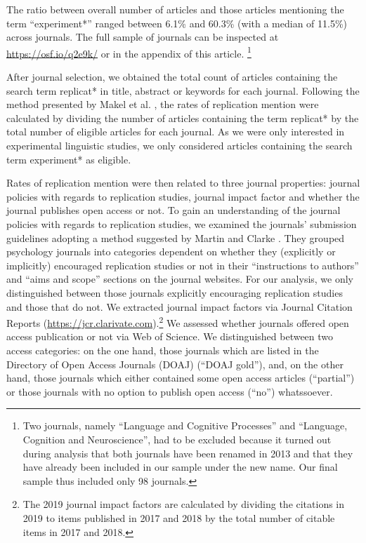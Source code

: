 \documentclass[cm,linguex]{glossa}
\begin{document}
The ratio between overall number of articles and those articles mentioning the term ``experiment*'' ranged between 6.1\% and 60.3\% (with a median of 11.5\%) across journals.
The full sample of journals can be inspected at \url{https://osf.io/q2e9k/} or in the appendix of this article. \footnote{Two journals, namely ``Language and Cognitive Processes'' and ``Language, Cognition and Neuroscience'', had to be excluded because it turned out during analysis that both journals have been renamed in 2013 and that they have already been included in our sample under the new name. Our final sample thus included only 98 journals.}

After journal selection, we obtained the total count of articles containing the search term replicat* in title, abstract or keywords for each journal.
Following the method presented by Makel et al. \citeyearpar{makel_replications_2012}, the rates of replication mention were calculated by dividing the number of articles containing the term replicat* by the total number of eligible articles for each journal. As we were only interested in experimental linguistic studies, we only considered articles containing the search term experiment* as eligible.

Rates of replication mention were then related to three journal properties: journal policies with regards to replication studies, journal impact factor and whether the journal publishes open access or not.
To gain an understanding of the journal policies with regards to replication studies, we examined the journals' submission guidelines adopting a method suggested by Martin and Clarke \citeyearpar{martin_are_2017}.
They grouped psychology journals into categories dependent on whether they (explicitly or implicitly) encouraged replication studies or not in their ``instructions to authors'' and ``aims and scope'' sections on the journal websites. For our analysis, we only distinguished between those journals explicitly encouraging replication studies and those that do not.
We extracted journal impact factors via Journal Citation Reports (\url{https://jcr.clarivate.com}).\footnote{The 2019 journal impact factors are calculated by dividing the citations in 2019 to items published in 2017 and 2018 by the total number of citable items in 2017 and 2018.}
We assessed whether journals offered open access publication or not via Web of Science.
We distinguished between two access categories: on the one hand, those journals which are listed in the Directory of Open Access Journals (DOAJ) (``DOAJ gold''), and, on the other hand, those journals which either contained some open access articles (``partial'') or those journals with no option to publish open access (``no'') whatssoever.
\end{document}
